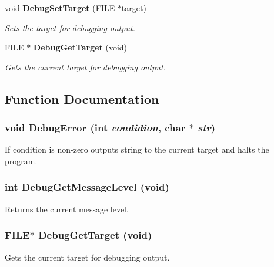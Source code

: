 \begin{CompactItemize}
void {\bf Debug\-Set\-Target} (FILE $\ast$target)
\begin{CompactList}\small\item\em Sets the target for debugging output. \item\end{CompactList}\item 
FILE $\ast$ {\bf Debug\-Get\-Target} (void)
\begin{CompactList}\small\item\em Gets the current target for debugging output. \item\end{CompactList}\end{CompactItemize}


\subsection{Function Documentation}
\subsubsection{\setlength{\rightskip}{0pt plus 5cm}void Debug\-Error (int {\em condidion}, char $\ast$ {\em str})}\label{Debug_8h_a1}


If condition is non-zero outputs string to the current target and halts the program. 

\subsubsection{\setlength{\rightskip}{0pt plus 5cm}int Debug\-Get\-Message\-Level (void)}\label{Debug_8h_a3}


Returns the current message level. 

\subsubsection{\setlength{\rightskip}{0pt plus 5cm}FILE$\ast$ Debug\-Get\-Target (void)}\label{Debug_8h_a6}


Gets the current target for debugging output. 

